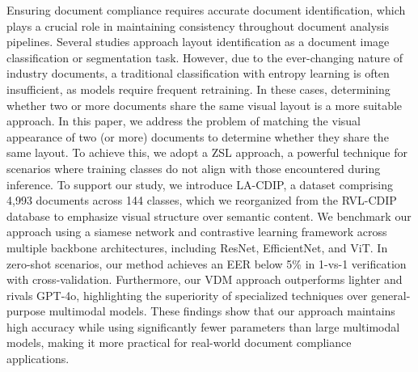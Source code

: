 Ensuring document compliance requires accurate document identification, which plays a crucial role in maintaining consistency throughout document analysis pipelines. Several studies approach layout identification as a document image classification or segmentation task. However, due to the ever-changing nature of industry documents, a traditional classification with entropy learning is often insufficient, as models require frequent retraining. In these cases, determining whether two or more documents share the same visual layout is a more suitable approach.
In this paper, we address the problem of matching the visual appearance of two (or more) documents to determine whether they share the same layout. To achieve this, we adopt a \acrfull{ZSL} approach, a powerful technique for scenarios where training classes do not align with those encountered during inference. %
To support our study, we introduce \acrfull{LA-CDIP}, a dataset comprising 4,993 documents across 144 classes, which we reorganized from the \acrfull{RVL-CDIP} database to emphasize visual structure over semantic content. We benchmark our approach using a siamese network and contrastive learning framework across multiple backbone architectures, including ResNet, EfficientNet, and \acrfull{ViT}.
In zero-shot scenarios, our method achieves an \acrfull{EER} below 5\% in 1-vs-1 verification with cross-validation. Furthermore, our \acrfull{VDM} approach outperforms lighter  and rivals GPT-4o, highlighting the superiority of specialized techniques over general-purpose multimodal models. These findings show that our approach maintains high accuracy while using significantly fewer parameters than large multimodal models, making it more practical for real-world document compliance applications.


